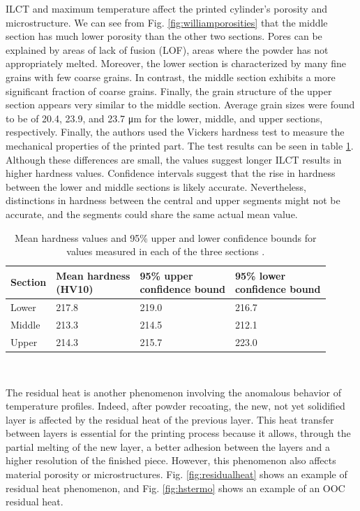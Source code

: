 ILCT and maximum temperature affect the printed cylinder's porosity and microstructure. We can see from Fig. \ref{fig:williamporosities} that the middle section has much lower porosity than the other two sections. Pores can be explained by areas of lack of fusion (LOF), areas where the powder has not appropriately melted. Moreover, the lower section is characterized by many fine grains with few coarse grains. In contrast, the middle section exhibits a more significant fraction of coarse grains. Finally, the grain structure of the upper section appears very similar to the middle section. Average grain sizes were found to be of \num{20.4}, \num{23.9}, and \num{23.7} \unit{\micro\metre} for the lower, middle, and upper sections, respectively. Finally, the authors used the Vickers hardness test to measure the mechanical properties of the printed part. The test results can be seen in table \ref{table:hard}. Although these differences are small, the values suggest longer ILCT results in higher hardness values. Confidence intervals suggest that the rise in hardness between the lower and middle sections is likely accurate. Nevertheless, distinctions in hardness between the central and upper segments might not be accurate, and the segments could share the same actual mean value.
\begin{table}
\footnotesize
    \centering 
    \begin{tabular}{|l l l l|}
    \hline
    Section & \makecell{Mean hardness \\(HV10)} & \makecell{95\% upper \\confidence bound} & \makecell{95\% lower \\ confidence bound} \T\B \\
    \hline \hline
    Lower & 217.8 & 219.0 & 216.7  \T\B \\ 
    Middle & 213.3 & 214.5 & 212.1  \T\B \\ 
    Upper & 214.3 & 215.7 & 223.0  \T\B \\ 
    
    \hline
    \end{tabular}
    \\[10pt]
    \caption{Mean hardness values and 95\% upper and lower confidence bounds for values measured in each of the three sections \cite{williams_situ_2019}.}
    \label{table:hard}
\end{table}
The residual heat is another phenomenon involving the anomalous behavior of temperature profiles. Indeed, after powder recoating, the new, not yet solidified layer is affected by the residual heat of the previous layer. This heat transfer between layers is essential for the printing process because it allows, through the partial melting of the new layer, a better adhesion between the layers and a higher resolution of the finished piece. However, this phenomenon also affects material porosity or microstructures. Fig. \ref{fig:residualheat} shows an example of residual heat phenomenon, and Fig. \ref{fig:hstermo} shows an example of an OOC residual heat.
